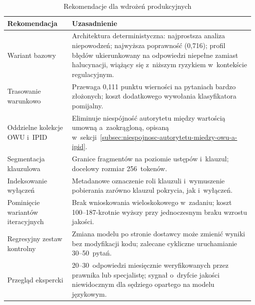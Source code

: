 \begin{table}[H]
  \caption{Rekomendacje dla wdrożeń produkcyjnych}\label{tab:rekomendacje-dla-wdrozen-produkcyjnych}
  \centering
  \small
  \renewcommand{\arraystretch}{1.3}
  \begin{tabularx}{\textwidth}{@{} l X @{}}
    \toprule
    \textbf{Rekomendacja} & \textbf{Uzasadnienie}                                                                           \\
    \midrule
    Wariant bazowy
    & Architektura deterministyczna: najprostsza analiza niepowodzeń; najwyższa poprawność (0{,}716);
    profil błędów ukierunkowany na odpowiedzi niepełne zamiast
    halucynacji, wiążący się z~niższym ryzykiem w~kontekście regulacyjnym.                                                  \\
    Trasowanie warunkowo
    & Przewaga 0{,}111 punktu wierności na pytaniach bardzo złożonych;
    koszt dodatkowego wywołania klasyfikatora pomijalny.                                                                    \\
    Oddzielne kolekcje OWU i~IPID
    & Eliminuje niespójność autorytetu między wartością umowną
    a~zaokrągloną, opisaną w~sekcji~\ref{subsec:niespojnosc-autorytetu-miedzy-owu-a-ipid}.                                  \\
    Segmentacja klauzulowa
    & Granice fragmentów na poziomie ustępów i~klauzul;
    docelowy rozmiar 256~tokenów.                                                                                           \\
    Indeksowanie wyłączeń
    & Metadanowe oznaczenie roli klauzuli i~wymuszenie pobierania
    zarówno klauzul pokrycia, jak i~wyłączeń.                                                                               \\
    Pominięcie wariantów iteracyjnych
    & Brak wnioskowania wieloskokowego w~zadaniu;
    koszt 100--187-krotnie wyższy przy jednoczesnym braku wzrostu jakości.                                                  \\
    Regresyjny zestaw kontrolny
    & Zmiana modelu po stronie dostawcy może zmienić wyniki bez
    modyfikacji kodu; zalecane cykliczne uruchamianie 30--50~pytań.                                                         \\
    Przegląd ekspercki
    & 20--30~odpowiedzi miesięcznie weryfikowanych przez prawnika
    lub specjalistę; sygnał o~dryfcie jakości niewidocznym dla
    sędziego opartego na modelu językowym.                                                                                  \\
    \bottomrule
  \end{tabularx}
\end{table}

